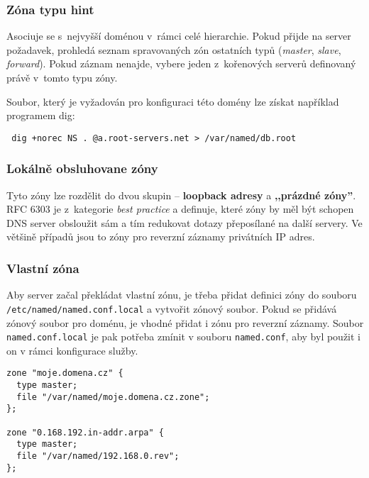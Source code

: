 \subsubsection{Zóna typu hint}
Asociuje se s~nejvyšší doménou v~rámci celé hierarchie. Pokud přijde na server požadavek, prohledá seznam spravovaných zón ostatních typů ({\em master}, {\em slave}, {\em forward}). Pokud záznam nenajde, vybere jeden z~kořenových serverů definovaný právě v~tomto typu zóny.

Soubor, který je vyžadován pro konfiguraci této domény lze získat například programem dig:
\begin{verbatim}
 dig +norec NS . @a.root-servers.net > /var/named/db.root
\end{verbatim}

\subsubsection{Lokálně obsluhovane zóny}
Tyto zóny lze rozdělit do dvou skupin -- {\bf loopback adresy} a {\bf ,,prázdné zóny''}. RFC 6303
\cite{rfc6303} je z~kategorie {\em best practice} a definuje, které zóny by měl být schopen DNS server
obsloužit sám a tím redukovat dotazy přeposílané na další servery. Ve většině případů jsou to zóny pro reverzní záznamy privátních IP adres.


\subsubsection{Vlastní zóna}
Aby server začal překládat vlastní zónu, je třeba přidat definici zóny do souboru {\tt /etc/named/named.conf.local} a vytvořit zónový soubor. Pokud se přidává zónový soubor pro doménu, je vhodné přidat i zónu pro reverzní záznamy. Soubor {\tt named.conf.local} je pak potřeba zmínit v souboru {\tt named.conf}, aby byl použit i on v rámci konfigurace služby.

\begin{verbatim}
zone "moje.domena.cz" {
  type master;
  file "/var/named/moje.domena.cz.zone";
};

zone "0.168.192.in-addr.arpa" {
  type master;
  file "/var/named/192.168.0.rev";
};
\end{verbatim}

